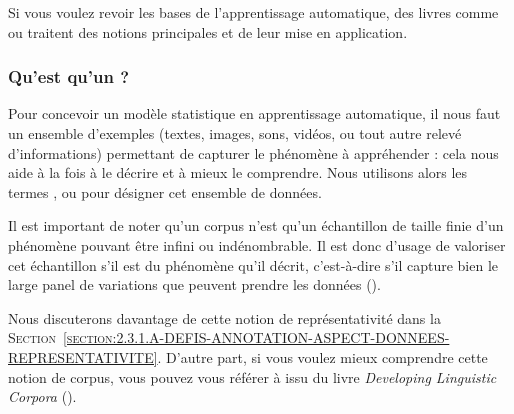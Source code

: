 			\begin{leftBarInformation}
				Si vous voulez revoir les bases de l'apprentissage automatique, des livres comme \cite{zhou:2021:machine-learning} ou \cite{raschka-mirjalili:2019:python-machine-learning} traitent des notions principales et de leur mise en application.
			\end{leftBarInformation}
			
		\subsubsection{Qu'est qu'un \textguillemets{\texttt{corpus d’entraînement}} ?}
		\label{section:2.1.1.B-PRESENTATION-ANNOTATION-DEFINITION-BASE-APPRENTISSAGE}

			Pour concevoir un modèle statistique en apprentissage automatique, il nous faut un ensemble d'exemples (textes, images, sons, vidéos, ou tout autre relevé d'informations) permettant de capturer le phénomène à appréhender : cela nous aide à la fois à le décrire et à mieux le comprendre.
			Nous utilisons alors les termes ,  ou  pour désigner cet ensemble de données.
			
			Il est important de noter qu'un corpus n'est qu'un échantillon de taille finie d'un phénomène pouvant être infini ou indénombrable.
			Il est donc d'usage de valoriser cet échantillon s'il est  du phénomène qu'il décrit, c'est-à-dire s'il capture bien le large panel de variations que peuvent prendre les données (\cite{biber:1993:representativeness-corpus-design}).
			
			\begin{leftBarInformation}
				Nous discuterons davantage de cette notion de représentativité dans la \textsc{Section~\ref{section:2.3.1.A-DEFIS-ANNOTATION-ASPECT-DONNEES-REPRESENTATIVITE}}.
				D'autre part, si vous voulez mieux comprendre cette notion de corpus, vous pouvez vous référer à \cite{sinclair:2004:corpus-text-basic} issu du livre \textit{Developing Linguistic Corpora} (\cite{wynne:2004:developing-linguistic-corpora}).
			\end{leftBarInformation}
		
